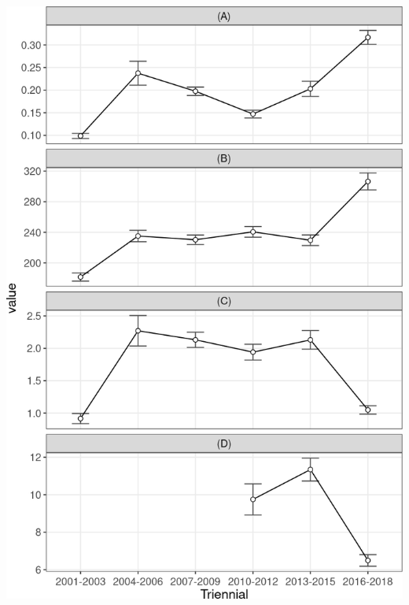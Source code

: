\documentclass[10pt,landscape,a3paper]{article}
\begin{document}
\begin{center}\includegraphics{img/modelling/aa-eda-ts-10} \end{center}
\end{document}

